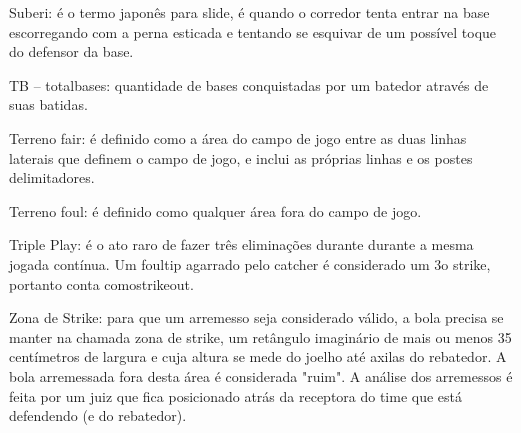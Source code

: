 Suberi: é o termo japonês para \gls{slide}, é quando o corredor tenta entrar na base escorregando com a perna esticada e tentando se esquivar de um possível toque do defensor da base.

TB -- \glspl{totalbase}: quantidade de bases conquistadas por um batedor através de suas batidas.

Terreno \gls{fair}: é definido como a área do campo de jogo entre as duas linhas laterais que definem o campo de jogo, e inclui as próprias linhas e os postes delimitadores.

Terreno \gls{foul}: é definido como qualquer área fora do campo de jogo.

Triple Play: é o ato raro de fazer três eliminações durante durante a mesma jogada contínua. Um \gls{foultip} agarrado pelo catcher é considerado um 3o strike, portanto conta como\gls{strikeout}.



Zona de Strike: para que um arremesso seja considerado válido, a bola precisa se manter na chamada zona de strike, um retângulo imaginário de mais ou menos 35 centímetros de largura e cuja altura se mede do joelho até axilas do rebatedor. A bola arremessada fora desta área é considerada "ruim". A análise dos arremessos é feita por um juiz que fica posicionado atrás da receptora do time que está defendendo (e do rebatedor).
